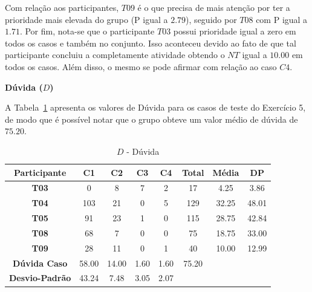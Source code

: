 Com relação aos participantes, $T09$ é o que precisa de mais atenção por ter a prioridade mais elevada do grupo (P igual a $2.79$), seguido por $T08$ com P igual a $1.71$. Por fim, nota-se que o participante $T03$ possui prioridade igual a zero em todos os casos e também no conjunto. Isso aconteceu devido ao fato de que tal participante concluiu a completamente atividade obtendo o $NT$ igual a $10.00$ em todos os casos. Além disso, o mesmo se pode afirmar com relação ao caso $C4$.

\textbf{Dúvida ($D$)}

A Tabela~\ref{tab:F3_A5_D} apresenta os valores de Dúvida para os casos de teste do Exercício 5, de modo que é possível notar que o grupo obteve um valor médio de dúvida de $75.20$.

\begin{table}[htbp]
	\centering
	\caption{$D$ - Dúvida}
	\begin{tabular}{|c|c|c|c|c|ccc}
		\hline
		\rowcolor[HTML]{D0CECE} 
		\textbf{Participante} & \textbf{C1} & \textbf{C2} & \textbf{C3} & \textbf{C4} & \multicolumn{1}{c|}{\cellcolor[HTML]{D0CECE}\textbf{Total}} & \multicolumn{1}{c|}{\cellcolor[HTML]{D0CECE}\textbf{Média}} & \multicolumn{1}{c|}{\cellcolor[HTML]{D0CECE}\textbf{DP}} \\ \hline
		\textbf{T03} & 0 & 8 & 7 & 2 & \multicolumn{1}{c|}{17} & \multicolumn{1}{c|}{4.25} & \multicolumn{1}{c|}{3.86} \\ \hline
		\rowcolor[HTML]{D0CECE} 
		\textbf{T04} & 103 & 21 & 0 & 5 & \multicolumn{1}{c|}{\cellcolor[HTML]{D0CECE}129} & \multicolumn{1}{c|}{\cellcolor[HTML]{D0CECE}32.25} & \multicolumn{1}{c|}{\cellcolor[HTML]{D0CECE}48.01} \\ \hline
		\textbf{T05} & 91 & 23 & 1 & 0 & \multicolumn{1}{c|}{115} & \multicolumn{1}{c|}{28.75} & \multicolumn{1}{c|}{42.84} \\ \hline
		\rowcolor[HTML]{D0CECE} 
		\textbf{T08} & 68 & 7 & 0 & 0 & \multicolumn{1}{c|}{\cellcolor[HTML]{D0CECE}75} & \multicolumn{1}{c|}{\cellcolor[HTML]{D0CECE}18.75} & \multicolumn{1}{c|}{\cellcolor[HTML]{D0CECE}33.00} \\ \hline
		\textbf{T09} & 28 & 11 & 0 & 1 & \multicolumn{1}{c|}{40} & \multicolumn{1}{c|}{10.00} & \multicolumn{1}{c|}{12.99} \\ \hline
		\cellcolor[HTML]{D0CECE}\textbf{Dúvida Caso} & \cellcolor[HTML]{D0CECE}58.00 & \cellcolor[HTML]{D0CECE}14.00 & \cellcolor[HTML]{D0CECE}1.60 & \cellcolor[HTML]{D0CECE}1.60 & \multicolumn{1}{c|}{\cellcolor[HTML]{D0CECE}75.20} & \multicolumn{1}{l}{} & \multicolumn{1}{l}{} \\ \cline{1-6}
		\textbf{Desvio-Padrão} & 43.24 & 7.48 & 3.05 & 2.07 & \multicolumn{1}{l}{} & \multicolumn{1}{l}{} & \multicolumn{1}{l}{} \\ \cline{1-5}
	\end{tabular}
	\label{tab:F3_A5_D}
\end{table}

